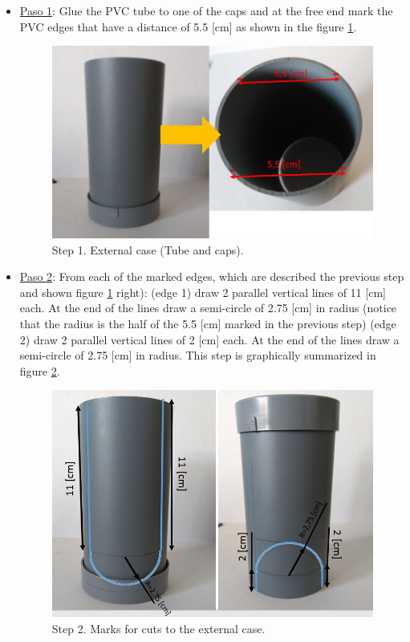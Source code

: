 \documentclass[12pt,letterpaper]{article}
\numberwithin{figure}{section}
\numberwithin{equation}{section}
\numberwithin{table}{section}
\begin{document}
\begin{itemize}
\item \underline{Paso 1}: Glue the PVC tube to one of the caps and at the free end mark the PVC edges that have a distance of 5.5 [cm] as shown in the figure \ref{fig:36}.
    
    \begin{figure}[H]
        \centering
        \includegraphics[scale=0.6]{Figuras/figure_36.jpg}
        \caption{Step 1. External case (Tube and caps).}
        \label{fig:36}    
    \end{figure}
    
\item \underline{Paso 2}: From each of the marked edges, which are described the previous step and shown figure \ref{fig:36} right): (edge 1) draw 2 parallel vertical lines of 11 [cm] each. At the end of the lines draw a semi-circle of 2.75 [cm] in radius (notice that the radius is the half of the 5.5 [cm] marked in the previous step) (edge 2) draw 2 parallel vertical lines of 2 [cm] each. At the end of the lines draw a semi-circle of 2.75 [cm] in radius. This step is graphically summarized in figure \ref{fig:37}.

    \begin{figure}[H]
        \centering
        \includegraphics[scale=0.6]{Figuras/figure_37.jpg}
        \caption{Step 2. Marks for cuts to the external case.}
        \label{fig:37}    
    \end{figure}
    

\end{itemize}
\end{document}
